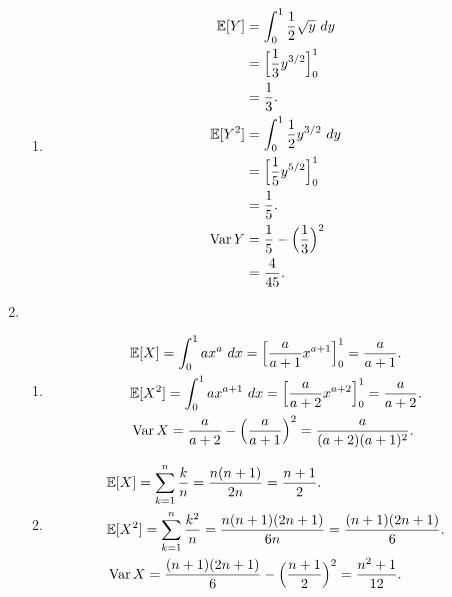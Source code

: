 \documentclass{article}
\DeclareMathOperator{\var}{Var}
\begin{document}
\begin{enumerate}
\begin{enumerate}
        \item \begin{align*}
            \mathbb{E}[Y]
            &= \int_{0}^{1} \frac{1}{2}\sqrt{y} \ dy \\
            &= \Bigl[ \frac{1}{3}y^{3/2} \Bigr]_{0}^{1} \\
            &= \frac{1}{3}. \\
            \mathbb{E}[Y^2]
            &= \int_{0}^{1} \frac{1}{2}y^{3 / 2} \ dy \\
            &= \Bigl[ \frac{1}{5}y^{5 / 2} \Bigr]_{0}^{1} \\
            &= \frac{1}{5}. \\
            \var{Y}
            &= \frac{1}{5} - \Bigl( \frac{1}{3} \Bigr)^2 \\
            &= \frac{4}{45}.
        \end{align*}
    \end{enumerate}

    \item \begin{enumerate}
        \item \begin{align*}
            &\mathbb{E}[X]
            = \int_{0}^{1} ax^a \ dx
            = \Bigl[ \frac{a}{a + 1} x^{a + 1} \Bigr]_{0}^{1}
            = \frac{a}{a + 1}. \\
            &\mathbb{E}[X^2]
            = \int_{0}^{1} ax^{a + 1} \ dx 
            = \Bigl[ \frac{a}{a + 2} x^{a + 2} \Bigr]_{0}^{1} 
            = \frac{a}{a + 2}. \\
            &\var{X} 
            = \frac{a}{a + 2} - \Bigl( \frac{a}{a + 1} \Bigr)^{2} 
            = \frac{a}{(a + 2)(a + 1)^2}.
        \end{align*}

        \item \begin{align*}
            &\mathbb{E}[X] 
            = \sum_{k = 1}^{n} \frac{k}{n} 
            = \frac{n(n + 1)}{2n} 
            = \frac{n + 1}{2}. \\
            &\mathbb{E}[X^2] 
            = \sum_{k = 1}^{n} \frac{k^2}{n} 
            = \frac{n(n + 1)(2n + 1)}{6n}
            = \frac{(n + 1)(2n + 1)}{6}. \\
            &\var{X} 
            = \frac{(n + 1)(2n + 1)}{6} - \Bigl( \frac{n + 1}{2} \Bigr)^2 
            = \frac{n^2 + 1}{12}.
        \end{align*}


\end{enumerate}
\end{enumerate}
\end{document}
